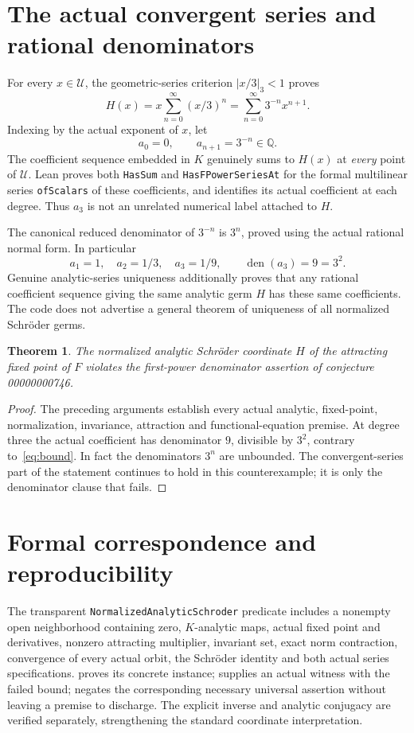 \documentclass[10pt,a4paper]{article}
\newtheorem{theorem}{Theorem}
\newcommand{\Q}{\mathbb Q}
\newcommand{\U}{\mathcal U}
\begin{document}
\section{The actual convergent series and rational denominators}
For every $x\in\U$, the geometric-series criterion $|x/3|_3<1$ proves
\[
 H(x)=x\sum_{n=0}^{\infty}(x/3)^n
     =\sum_{n=0}^{\infty}3^{-n}x^{n+1}.
\]
Indexing by the actual exponent of $x$, let
\[
 a_0=0,\qquad a_{n+1}=3^{-n}\in\Q.
\]
The coefficient sequence embedded in $K$ genuinely sums to $H(x)$ at \emph{every} point of
$\U$. Lean proves both \texttt{HasSum} and \texttt{HasFPowerSeriesAt} for the formal
multilinear series \texttt{ofScalars} of these coefficients, and identifies its actual
coefficient at each degree. Thus $a_3$ is not an unrelated numerical label attached to $H$.

The canonical reduced denominator of $3^{-n}$ is $3^n$, proved using the actual rational
normal form. In particular
\[
 a_1=1,\quad a_2=1/3,\quad a_3=1/9,\qquad
 \operatorname{den}(a_3)=9=3^2.
\]
Genuine analytic-series uniqueness additionally proves that any rational coefficient
sequence giving the same analytic germ $H$ has these same coefficients. The code does not
advertise a general theorem of uniqueness of all normalized Schr\"oder germs.

\begin{theorem}
The normalized analytic Schr\"oder coordinate $H$ of the attracting fixed point of $F$
violates the first-power denominator assertion of conjecture 00000000746.
\end{theorem}
\begin{proof}
The preceding arguments establish every actual analytic, fixed-point, normalization,
invariance, attraction and functional-equation premise. At degree three the actual
coefficient has denominator $9$, divisible by $3^2$, contrary to~\eqref{eq:bound}.
In fact the denominators $3^n$ are unbounded. The convergent-series part of the statement
continues to hold in this counterexample; it is only the denominator clause that fails.
\end{proof}

\section{Formal correspondence and reproducibility}
The transparent \texttt{NormalizedAnalyticSchroder} predicate includes a nonempty open
neighborhood containing zero, $K$-analytic maps, actual fixed point and derivatives,
nonzero attracting multiplier, invariant set, exact norm contraction, convergence of every
actual orbit, the Schr\"oder identity and both actual series specifications.
 proves its concrete instance;
 supplies an actual witness with the failed bound;
 negates the corresponding necessary universal
assertion without leaving a premise to discharge. The explicit inverse and analytic conjugacy
are verified separately, strengthening the standard coordinate interpretation.
\end{document}
